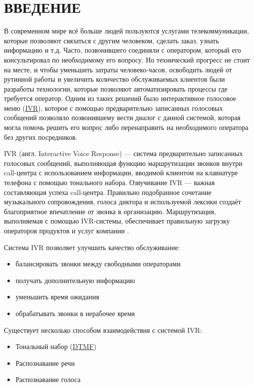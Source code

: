 \chapter{ВВЕДЕНИЕ}

В современном мире всё больше людей пользуются услугами телекоммуникации, которые
позволяют связаться с другим человеком, сделать заказ, узнать информацию и т.д.
Часто, позвонившего соединяли с оператором, который его консультировал по необходимому
его вопросу. Но технический прогресс не стоит на месте, и чтобы уменьшить
затраты человеко-часов, освободить людей от рутинной работы и увеличить
количество обслуживаемых клиентов были разработы технологии, которые позволяют
автоматизировать процессы где требуется оператор. Одним из таких решений было
интерактивное голосовое меню (\hyperlink{ivr}{IVR}), которое с помощью предварительно записанных голосовых
сообщений позволяло позвонившему вести диалог с данной системой, которая могла
помочь решить его вопрос либо перенаправить на необходимого оператора без других
посредников.

IVR (англ. Interactive Voice Response) — система предварительно записанных
голосовых сообщений, выполняющая функцию маршрутизации звонков внутри call-центра
с использованием информации, вводимой клиентом на клавиатуре телефона с помощью
тонального набора. Озвучивание IVR — важная составляющая успеха call-центра.
Правильно подобранное сочетание музыкального сопровождения, голоса диктора и
используемой лексики создаёт благоприятное впечатление от звонка в организацию.
Маршрутизация, выполняемая с помощью IVR-системы, обеспечивает правильную загрузку
операторов продуктов и услуг компании \cite{ivr}.

Система IVR позволяет улучшить качество обслуживание:
\begin{itemize}
    \item балансировать звонки между свободными операторами
    \item получать дополнительную информацию
    \item уменьшить время ожидания
    \item обрабатывать звонки в нерабочее время
\end{itemize}

Существует несколько способом взаимодействия с системой IVR:
\begin{itemize}
    \item Тональный набор (\hyperlink{dtmf}{DTMF})
    \item Распознавание речи
    \item Распознавание голоса
\end{itemize}

